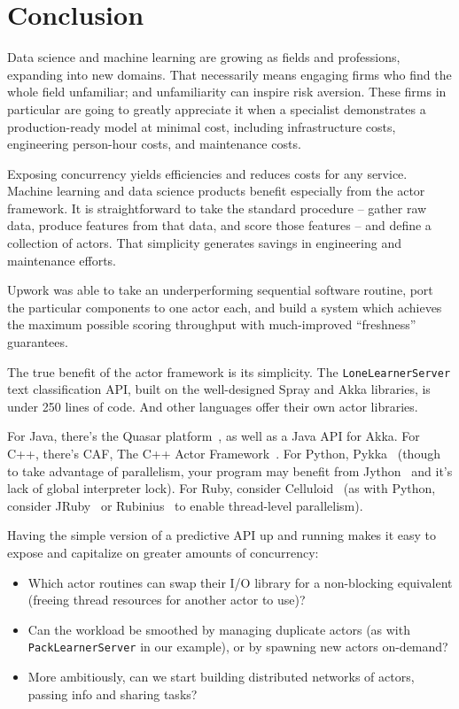 \documentclass[tablecaption=bottom,wcp]{jmlr}
\begin{document}
\section{Conclusion}

Data science and machine learning are growing as fields and professions, 
expanding into new domains. That necessarily means engaging firms who 
find the whole field unfamiliar; and unfamiliarity can inspire risk aversion. 
These firms in particular are going to greatly appreciate it when a specialist
demonstrates a production-ready model at minimal cost, including infrastructure
costs, engineering person-hour costs, and maintenance costs.

Exposing concurrency yields efficiencies and reduces costs for any service.
Machine learning and data science products benefit especially from the actor 
framework. It is straightforward to take the standard procedure -- gather raw data, 
produce features from that data, and score those features -- and define a collection 
of actors. That simplicity generates savings in engineering and maintenance efforts.

Upwork was able to take an underperforming sequential software routine, port the
particular components to one actor each, and build a system which achieves the
maximum possible scoring throughput with much-improved ``freshness'' guarantees.

The true benefit of the actor framework is its simplicity. The \texttt{LoneLearnerServer}
text classification API, built on the well-designed Spray and Akka libraries, is under 
250 lines of code. And other languages offer their own actor libraries.

For Java, there's the Quasar platform~\citep{quasar_doc}, as well as a Java API for
Akka. For C++, there's CAF, The C++ Actor Framework~\citep{charousset2014caf}.
For Python, Pykka~\citep{pykka_doc} (though to take advantage of parallelism,
your program may benefit from Jython~\citep{jython} and it's lack of global interpreter
lock). For Ruby, consider Celluloid~\citep{celluloid_doc} (as with Python, consider 
JRuby~\citep{jruby_doc} or Rubinius~\citep{rubinius_doc} to enable thread-level
parallelism).


Having the simple version of a predictive API up and running
makes it easy to expose and capitalize on greater amounts of concurrency:
\begin{itemize}
\item Which actor routines can swap their I/O library for a non-blocking equivalent
(freeing thread resources for another actor to use)? 
\item Can the workload be smoothed by managing duplicate actors (as with
 \texttt{PackLearnerServer} in our example), or by spawning new actors 
 on-demand? 
\item More ambitiously, can we start building distributed networks of actors, passing 
info and sharing tasks?
\end{itemize}
\end{document}
